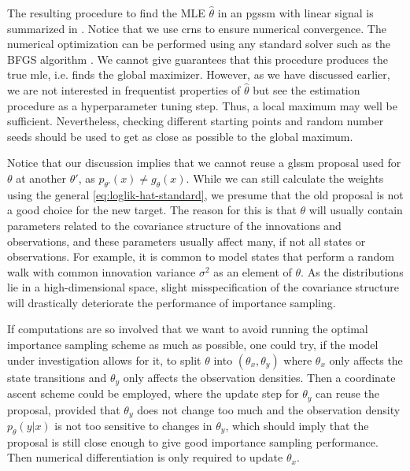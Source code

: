 The resulting procedure to find the MLE $\hat \theta$ in an \gls{pgssm} with linear signal is summarized in . Notice that we use \glspl{crn} to ensure numerical convergence. The numerical optimization can be performed using any standard solver such as the BFGS algorithm \citep[Chapter 6.1]{Nocedal2006Numerical}. We cannot give guarantees that this procedure produces the true \gls{mle}, i.e. finds the global maximizer. However, as we have discussed earlier, we are not interested in frequentist properties of $\hat \theta$ but see the estimation procedure as a hyperparameter tuning step. Thus, a local maximum may well be sufficient. Nevertheless, checking different starting points and random number seeds should be used to get as close as possible to the global maximum.

Notice that our discussion implies that we cannot reuse a \gls{glssm} proposal used for $\theta$ at another $\theta'$, as $p_{\theta'}(x) \neq g_{\theta}(x)$. While we can still calculate the weights using the general \eqref{eq:loglik-hat-standard}, we presume that the old proposal is not a good choice for the new target. The reason for this is that $\theta$ will usually contain parameters related to the covariance structure of the innovations and observations, and these parameters usually affect many, if not all states or observations. For example, it is common to model states that perform a random walk with common innovation variance $\sigma^{2}$ as an element of $\theta$. As the distributions lie in a high-dimensional space, slight misspecification of the covariance structure will drastically deteriorate the performance of importance sampling. 

If computations are so involved that we want to avoid running the optimal importance sampling scheme as much as possible, one could try, if the model under investigation allows for it, to split $\theta$ into $(\theta_{x}, \theta_y)$ where $\theta_{x}$ only affects the state transitions and $\theta_{y}$ only affects the observation densities. Then a coordinate ascent scheme could be employed, where the update step for $\theta_{y}$ can reuse the proposal, provided that $\theta_{y}$ does not change too much and the observation density $p_{\theta}(y|x)$ is not too sensitive to changes in $\theta_{y}$, which should imply that the proposal is still close enough to give good importance sampling performance. Then numerical differentiation is only required to update $\theta_{x}$. 


